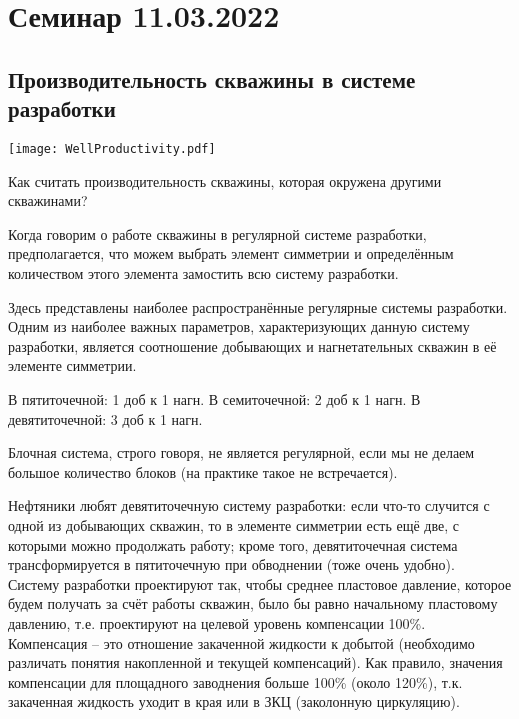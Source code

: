 \documentclass[main.tex]{subfiles}
\begin{document}
\section{Семинар 11.03.2022}

\subsection{Производительность скважины в системе разработки}

\texttt{[image: WellProductivity.pdf]}

Как считать производительность скважины, которая окружена другими скважинами?

Когда говорим о работе скважины в регулярной системе разработки, предполагается, что можем выбрать элемент симметрии и определённым количеством этого элемента замостить всю систему разработки.

Здесь представлены наиболее распространённые регулярные системы разработки. Одним из наиболее важных параметров, характеризующих данную систему разработки, является соотношение добывающих и нагнетательных скважин в её элементе симметрии.

В пятиточечной: 1 доб к 1 нагн. В семиточечной: 2 доб к 1 нагн. В девятиточечной: 3 доб к 1 нагн.

Блочная система, строго говоря, не является регулярной, если мы не делаем большое количество блоков (на практике такое не встречается).

Нефтяники любят девятиточечную систему разработки: если что-то случится с одной из добывающих скважин, то в элементе симметрии есть ещё две, с которыми можно продолжать работу; кроме того, девятиточечная система трансформируется в пятиточечную при обводнении (тоже очень удобно).\\

Систему разработки проектируют так, чтобы среднее пластовое давление, которое будем получать за счёт работы скважин, было бы равно начальному пластовому давлению, т.е. проектируют на целевой уровень компенсации 100\%.\\

Компенсация -- это отношение закаченной жидкости к добытой (необходимо различать понятия накопленной и текущей компенсаций). Как правило, значения компенсации для площадного заводнения больше 100\% (около 120\%), т.к. закаченная жидкость уходит в края или в ЗКЦ (заколонную циркуляцию).\\
\end{document}

